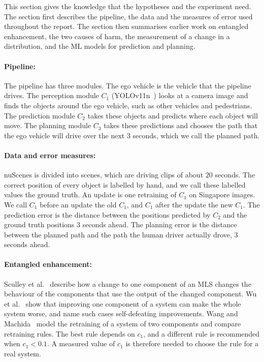 \documentclass[11pt,a4paper]{article}
\begin{document}
This section gives the knowledge that the hypotheses and the experiment
need. The section first describes the pipeline, the data and the measures
of error used throughout the report. The section then summarises earlier
work on entangled enhancement, the two causes of harm, the measurement of
a change in a distribution, and the ML models for prediction and planning.

\paragraph{Pipeline:} The pipeline has three modules. The ego vehicle is the
vehicle that the pipeline drives. The perception module $C_1$
(YOLOv11n~\cite{jocher2024yolo11}) looks at a camera image and finds the
objects around the ego vehicle, such as other vehicles and pedestrians. The
prediction module $C_2$ takes these objects and predicts where each object
will move. The planning module $C_3$ takes these predictions and chooses
the path that the ego vehicle will drive over the next $3$ seconds, which
we call the planned path.

\paragraph{Data and error measures:} nuScenes is divided into scenes, which
are driving clips of about $20$ seconds. The correct position of every
object is labelled by hand, and we call these labelled values the ground
truth. An update is one retraining of $C_1$ on Singapore images. We call
$C_1$ before an update the old $C_1$, and $C_1$ after the update the new
$C_1$. The
prediction error is the distance between the positions predicted by $C_2$
and the ground truth positions $3$ seconds ahead. The planning error is the
distance between the planned path and the path the human driver actually
drove, $3$ seconds ahead.

\paragraph{Entangled enhancement:} Sculley et
al.~\cite{sculley2015hidden} describe how a change to one component of an
MLS changes the behaviour of the components that use the output of the
changed component. Wu et al.~\cite{wu2021fixesthatfail} show that
improving one component of a system can make the whole system worse, and
name such cases self-defeating improvements. Wang and
Machida~\cite{wang2024compsac,wang2025issre} model the retraining of a
system of two components and compare retraining rules. The best rule
depends on $c_1$, and a different rule is recommended when $c_1 < 0.1$. A
measured value of $c_1$ is therefore needed to choose the rule for a real
system.
\end{document}

